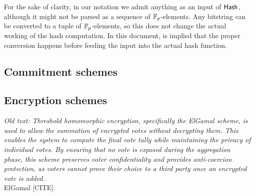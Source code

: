 For the sake of clarity, in our notation we admit anything as an input of ${\sf{Hash}}$, although it might not be parsed as a sequence of $\mathbb{F}_p$-elements. Any bitstring can be converted to a tuple of $\mathbb{F}_p$-elements, so this does not change the actual working of the hash computation. In this document, is implied that the proper conversion happens before feeding the input into the actual hash function.

\subsection{Commitment schemes}
\label{sec:cryptographic-primitives:commitments}


\subsection{Encryption schemes}
\label{sec:cryptographic-primitives:encryption}

\textit{Old text: Threshold homomorphic encryption, specifically the ElGamal scheme, is used to allow the summation of encrypted votes without decrypting them. This enables the system to compute the final vote tally while maintaining the privacy of individual votes. By ensuring that no vote is exposed during the aggregation phase, this scheme preserves voter confidentiality and provides anti-coercion protection, as voters cannot prove their choice to a third party once an encrypted vote is added.}\\

ElGamal [CITE].

\medskip

